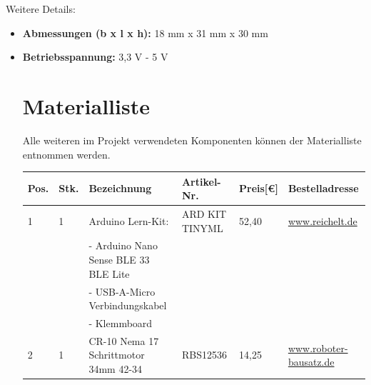 Weitere Details: \begin{itemize}
	\item \textbf{Abmessungen (b x l x h):} 18 mm x 31 mm x 30 mm
	\item \textbf{Betriebsspannung:} 3,3 V - 5 V
	\cite{SimacElec.2019}
	
\section{Materialliste}
Alle weiteren im Projekt verwendeten Komponenten können der Materialliste entnommen werden.
	\begin{center}
		\fontsize{8}{10}\selectfont
		\begin{tabularx}{\textwidth}{|p{0.4cm}|p{0.4cm}|X|X|p{1cm}|X|}
			\hline 
			\textbf{Pos.} & \textbf{Stk.} & \textbf{Bezeichnung} & \textbf{Artikel-Nr.} & \textbf{Preis[€]} & \textbf{Bestelladresse} \\ \hline
			1 & 1 & Arduino Lern-Kit: & ARD KIT TINYML & 52,40 & \href{https://www.reichelt.de}{www.reichelt.de} \\
			&   & - Arduino Nano Sense BLE 33 BLE Lite & & & \\ 
			&   &- USB-A-Micro Verbindungskabel & & & \\
			&   &- Klemmboard & & & \\
			\hline
			2 & 1 & CR-10 Nema 17 Schrittmotor 34mm 42-34 & RBS12536 & 14,25 & \href{https://www.roboter-bausatz.de/p/cr-10-nema-17-schrittmotor-34mm-42-34}{www.roboter-bausatz.de} \\
			\hline
			

\end{tabularx}
\end{center}
\end{itemize}

